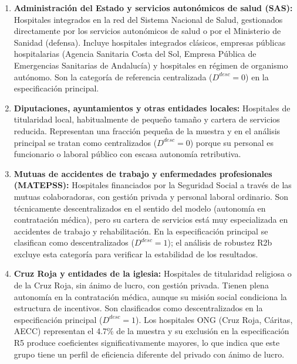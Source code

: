 \begin{enumerate}[label=(\roman*)]
  \item \textbf{Administración del Estado y servicios autonómicos de salud (SAS):} Hospitales integrados en la red del Sistema Nacional de Salud, gestionados directamente por los servicios autonómicos de salud o por el Ministerio de Sanidad (defensa). Incluye hospitales integrados clásicos, empresas públicas hospitalarias (Agencia Sanitaria Costa del Sol, Empresa Pública de Emergencias Sanitarias de Andalucía) y hospitales en régimen de organismo autónomo. Son la categoría de referencia centralizada ($D^{desc}=0$) en la especificación principal.

  \item \textbf{Diputaciones, ayuntamientos y otras entidades locales:} Hospitales de titularidad local, habitualmente de pequeño tamaño y cartera de servicios reducida. Representan una fracción pequeña de la muestra y en el análisis principal se tratan como centralizados ($D^{desc}=0$) porque su personal es funcionario o laboral público con escasa autonomía retributiva.

  \item \textbf{Mutuas de accidentes de trabajo y enfermedades profesionales (MATEPSS):} Hospitales financiados por la Seguridad Social a través de las mutuas colaboradoras, con gestión privada y personal laboral ordinario. Son técnicamente descentralizados en el sentido del modelo (autonomía en contratación médica), pero su cartera de servicios está muy especializada en accidentes de trabajo y rehabilitación. En la especificación principal se clasifican como descentralizados ($D^{desc}=1$); el análisis de robustez R2b excluye esta categoría para verificar la estabilidad de los resultados.

  \item \textbf{Cruz Roja y entidades de la iglesia:} Hospitales de titularidad religiosa o de la Cruz Roja, sin ánimo de lucro, con gestión privada. Tienen plena autonomía en la contratación médica, aunque su misión social condiciona la estructura de incentivos. Son clasificados como descentralizados en la especificación principal ($D^{desc}=1$). Los hospitales ONG (Cruz Roja, Cáritas, AECC) representan el 4.7\% de la muestra y su exclusión en la especificación R5 produce coeficientes significativamente mayores, lo que indica que este grupo tiene un perfil de eficiencia diferente del privado con ánimo de lucro.


\end{enumerate}
